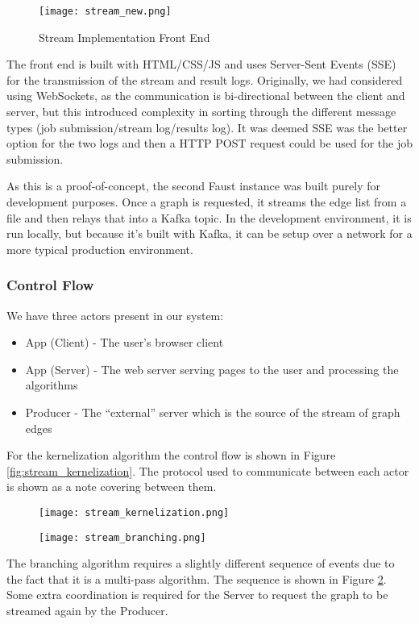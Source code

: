 \begin{figure}[htb]
    \centering
    \texttt{[image: stream\_new.png]}
    \caption{Stream Implementation Front End}
    \label{fig:stream_font_end}
\end{figure}

The front end is built with HTML/CSS/JS and uses Server-Sent Events (SSE) for
the transmission of the stream and result logs. Originally, we had considered
using WebSockets, as the communication is bi-directional between the client and
server, but this introduced complexity in sorting through the different message
types (job submission/stream log/results log). It was deemed SSE was the better
option for the two logs and then a HTTP POST request could be used for the job
submission.

As this is a proof-of-concept, the second Faust instance was built purely for
development purposes. Once a graph is requested, it streams the edge list from
a file and then relays that into a Kafka topic. In the development environment,
it is run locally, but because it's built with Kafka, it can be setup over a
network for a more typical production environment.

\subsubsection{Control Flow}

We have three actors present in our system:

\begin{itemize}
    \item
          App (Client) - The user's browser client
    \item
          App (Server) - The web server serving pages to the user and
          processing the algorithms
    \item
          Producer - The ``external'' server which is the source of the stream
          of graph edges
\end{itemize}

For the kernelization algorithm the control flow is shown in Figure
\ref{fig:stream_kernelization}. The protocol used to communicate between each
actor is shown as a note covering between them.

\begin{figure}[htb]
    \centering
    \begin{minipage}{.5\textwidth}
        \centering
        \texttt{[image: stream\_kernelization.png]}
        \label{fig:stream_kernelization}
    \end{minipage}%
    \begin{minipage}{.5\textwidth}
        \centering
        \texttt{[image: stream\_branching.png]}
        \label{fig:stream_branching}
    \end{minipage}
\end{figure}

The branching algorithm requires a slightly different sequence of events due to
the fact that it is a multi-pass algorithm. The sequence is shown in Figure
\ref{fig:stream_branching}. Some extra coordination is required for the Server
to request the graph to be streamed again by the Producer.
